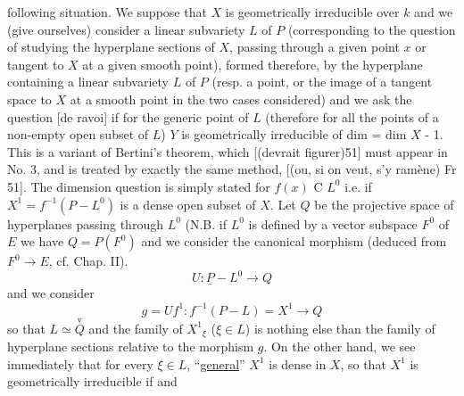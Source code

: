 
following situation.  We suppose that $X$ is geometrically
irreducible over $k$ and we (give ourselves) consider a linear
subvariety $L$ of $P$ (corresponding to the question of studying the
hyperplane sections of $X$, passing through a given point $x$ or
tangent to $X$ at a given smooth point), formed therefore, by the
hyperplane containing a linear subvariety $L$ of $P$ (resp. a point,
or the image of a tangent space to $X$ at a smooth point in the two
cases considered) and we ask the question [de ravoi] if for the
generic point of $L$ (therefore for all the points of a non-empty
open subset of $L$) $Y$ is geometrically irreducible of dim = dim $X$ -
1.  This is a variant of Bertini's theorem, which [(devrait
figurer)51] must appear in No. 3, and is treated by exactly the
same method, [(ou, si on veut, s'y ramène) Fr 51].  The dimension
question is simply stated for $f(x)$ C $L^0$ i.e. if $X^1 = f^{-1}(P - L^0)$ is
a dense open subset of $X$.  Let $Q$ be the projective space of
hyperplanes passing through $L^0$ (N.B. if $L^0$ is defined by a vector
subspace $F^0$ of $E$ we have $Q = P(F^0)$ and we consider the canonical
morphism (deduced from $F^0 \to E$, cf.  Chap. II).
\[ U : \underline{P} - L^0 \to Q \]
and we consider
\[ g = Uf^1 : f^{-1}(P - L) = X^1 \to Q \]
so that $L \simeq \overset{\textstyle\mathrm{v}}{Q}$ and the family of $X^1{}_{\xi}$ ($\xi \in L$) is nothing else than
the family of hyperplane sections relative to the morphism $g$.  On
the other hand, we see immediately that for every $\xi\in L$, ``\uline{general}''
$X^1$ is dense in $X$, so that $X^1$ is geometrically irreducible if and
